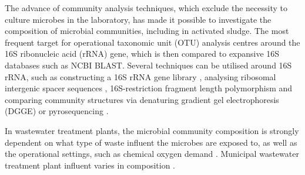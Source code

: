 \documentclass[11pt]{article}
\begin{document}
The advance of community analysis techniques, which exclude the necessity to culture microbes in the laboratory, has made it possible to investigate the composition of microbial communities, including in activated sludge. The most frequent target for operational taxonomic unit (OTU) analysis centres around the 16S ribonucleic acid (rRNA) gene, which is then compared to expansive 16S databases such as NCBI BLAST. Several techniques can be utilised around 16S rRNA, such as constructing a 16S rRNA gene library \cite{McGarvey_04}, analysing ribosomal intergenic spacer sequences \cite{Yu_01}, 16S-restriction fragment length polymorphism \cite{Gilbride_06} and comparing community structures via denaturing gradient gel electrophoresis (DGGE) \cite{Hesham_11} or pyrosequencing \cite{wang2012pyrosequencing}.


In wastewater treatment plants, the microbial community composition is strongly dependent on what type of waste influent the microbes are exposed to, as well as the operational settings, such as chemical oxygen demand \cite{Gilbride_06,wang2012pyrosequencing,hu2012microbial}. Municipal wastewater treatment plant influent varies in composition \citep{henze2002wastewater}.
\end{document}
